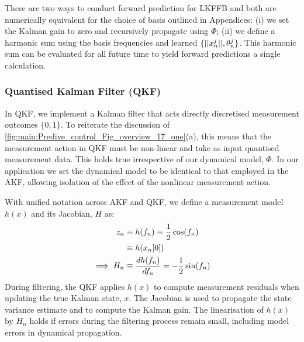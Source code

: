 \documentclass[pra, reprint]{revtex4-1}
\begin{document}
There are two ways to conduct forward prediction for LKFFB and both are numerically equivalent for the choice of basis outlined in Appendices: (i) we set the Kalman gain to zero and recursively propagate using $\Phi$; (ii) we define a harmonic sum using the basis frequencies and learned $\{||x^j_n||, \theta^{j}_{n} \}$.  This harmonic sum can be evaluated for all future time to yield forward predictions a single calculation. 





\subsubsection{Quantised Kalman Filter (QKF)}

In QKF, we implement a Kalman filter that acts directly discretised measurement outcomes $\{0,1\}$. To reiterate the discussion of  \cref{fig:main:Predive_control_Fig_overview_17_one}(a), this means that the measurement action in QKF must be non-linear and take as input quantised measurement data. This holds true irrespective of our dynamical model, $\Phi$.  In our application we set the dynamical model to be identical to that employed in the AKF, allowing isolation of the effect of the nonlinear measurement action.

With unified notation across AKF and QKF, we define a measurement model $h(x)$ and its Jacobian, $H$ as:
\begin{align}
z_n &  \equiv h(f_n) \equiv \frac{1}{2}\cos(f_{n}) \\
& \equiv h(x_n[0]) \\
\implies H_n &\equiv \frac{d h(f_n)}{df_n} =  -\frac{1}{2}\sin(f_{n})
\end{align}
During filtering, the QKF applies $h(x)$ to compute measurement residuals when updating the true Kalman state, $x$. The Jacobian is used to propagate the state variance estimate and to compute the Kalman gain. The linearisation of $h(x)$ by $H_n$ holds if errors during the filtering process remain small, including model errors in dynamical propagation. 
\end{document}
